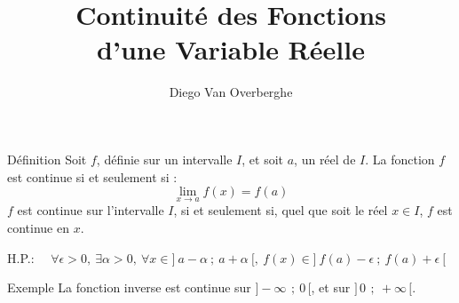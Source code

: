 \documentclass{cours}
\title{Continuité des Fonctions \\ d'une Variable Réelle}
\author{Diego Van Overberghe}
\begin{document}

    \begin{Gpartie}{Définition}
        Soit $f$, définie sur un intervalle $I$, et soit $a$, un réel de $I$.
        La fonction $f$ est continue si et seulement si : \[\boxed{\lim_{x \to a} f(x)=f(a)}\]
        $f$ est continue sur l'intervalle $I$, si et seulement si, quel que soit le réel $x\in I$, $f$ est continue en $x$.

        H.P.: $\quad\forall\epsilon >0,~\exists\alpha >0,~\forall x\in\big]~a-\alpha~;~a+\alpha~\big[,~f(x)\in\big]~f(a)-\epsilon~;~f(a)+\epsilon~\big[$
        \begin{Spartie}{Exemple}
            La fonction inverse est continue sur $\big]-\infty\,~;~0\,\big[$, et sur $\big]\,0\,~;~+\infty\,\big[$.


\end{Spartie}
\end{Gpartie}
\end{document}

